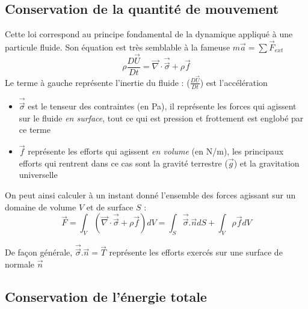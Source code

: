 \subsection{Conservation de la quantité de mouvement}
Cette loi correspond au principe fondamental de la dynamique appliqué à une particule fluide. Son équation est très semblable à la fameuse $m\vec{a}=\sum \vec{F}_{ext}$
%
\begin{equation}
\rho \frac{D\vec{U}}{Dt} = \vec{\nabla} \cdot \vec{\vec{\sigma}} + \rho \vec{f}
\label{eq:QDM}
\end{equation}
%
Le terme à gauche représente l'inertie du fluide : ($\frac{D\vec{U}}{Dt}$) est l'accélération

\begin{itemize}
\item $\vec{\vec{\sigma}}$ est le tenseur des contraintes (en Pa), il représente les forces qui agissent sur le fluide \textit{en surface}, tout ce qui est pression et frottement est englobé par ce terme

\item $\vec{f}$ représente les efforts qui agissent \textit{en volume} (en N/m), les principaux efforts qui rentrent dans ce cas sont la gravité terrestre ($\vec{g}$) et la gravitation universelle
\end{itemize}

On peut ainsi calculer à un instant donné l'ensemble des forces agissant sur un domaine de volume $V$ et de surface $S$ :
%
\begin{equation}
\vec{F} = \int_V { \left( \vec{\nabla} \cdot \vec{\vec{\sigma}} + \rho \vec{f} \right) dV }
        = \int_S { \vec{\vec{\sigma}}.\vec{n} dS} + \int_V {\rho \vec{f} dV }
\end{equation}

De façon générale, $\vec{\vec{\sigma}}.\vec{n} = \vec{T}$ représente les efforts exercés sur une surface de normale $\vec{n}$


\subsection{Conservation de l'énergie totale}

